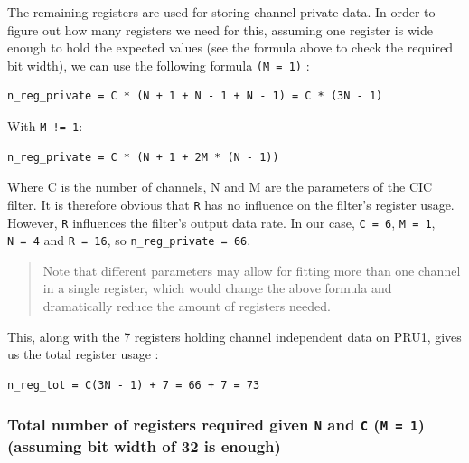 \documentclass[]{report}
\begin{document}
The remaining registers are used for storing channel private data. In
order to figure out how many registers we need for this, assuming one
register is wide enough to hold the expected values (see the formula
above to check the required bit width), we can use the following formula
\texttt{(M\ =\ 1)} :

\begin{verbatim}
n_reg_private = C * (N + 1 + N - 1 + N - 1) = C * (3N - 1)
\end{verbatim}

With \texttt{M\ !=\ 1}:

\begin{verbatim}
n_reg_private = C * (N + 1 + 2M * (N - 1))
\end{verbatim}

Where C is the number of channels, N and M are the parameters of the CIC
filter. It is therefore obvious that \texttt{R} has no influence on the
filter's register usage. However, \texttt{R} influences the filter's
output data rate. In our case, \texttt{C\ =\ 6}, \texttt{M\ =\ 1},
\texttt{N\ =\ 4} and \texttt{R\ =\ 16}, so
\texttt{n\_reg\_private\ =\ 66}.

\begin{quote}
Note that different parameters may allow for fitting more than one
channel in a single register, which would change the above formula and
dramatically reduce the amount of registers needed.
\end{quote}

This, along with the 7 registers holding channel independent data on
PRU1, gives us the total register usage :

\begin{verbatim}
n_reg_tot = C(3N - 1) + 7 = 66 + 7 = 73
\end{verbatim}

\hypertarget{total-number-of-registers-required-given-n-and-c-m-1-assuming-bit-width-of-32-is-enough}{%
\subsubsection{\texorpdfstring{Total number of registers required given
\texttt{N} and \texttt{C} (\texttt{M\ =\ 1}) (assuming bit width of 32
is
enough)}{Total number of registers required given N and C (M = 1) (assuming bit width of 32 is enough)}}\label{total-number-of-registers-required-given-n-and-c-m-1-assuming-bit-width-of-32-is-enough}}
\end{document}
